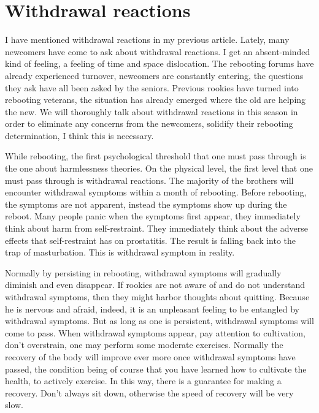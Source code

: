 \documentclass[
]{book}
\begin{document}
\hypertarget{withdrawal-reactions}{%
\section{Withdrawal reactions}\label{withdrawal-reactions}}

I have mentioned withdrawal reactions in my previous article. Lately, many newcomers have come to ask about withdrawal reactions. I get an absent-minded kind of feeling, a feeling of time and space dislocation. The rebooting forums have already experienced turnover, newcomers are constantly entering, the questions they ask have all been asked by the seniors. Previous rookies have turned into rebooting veterans, the situation has already emerged where the old are helping the new. We will thoroughly talk about withdrawal reactions in this season in order to eliminate any concerns from the newcomers, solidify their rebooting determination, I think this is necessary.

While rebooting, the first psychological threshold that one must pass through is the one about harmlessness theories. On the physical level, the first level that one must pass through is withdrawal reactions. The majority of the brothers will encounter withdrawal symptoms within a month of rebooting. Before rebooting, the symptoms are not apparent, instead the symptoms show up during the reboot. Many people panic when the symptoms first appear, they immediately think about harm from self-restraint. They immediately think about the adverse effects that self-restraint has on prostatitis. The result is falling back into the trap of masturbation. This is withdrawal symptom in reality.

Normally by persisting in rebooting, withdrawal symptoms will gradually diminish and even disappear. If rookies are not aware of and do not understand withdrawal symptoms, then they might harbor thoughts about quitting. Because he is nervous and afraid, indeed, it is an unpleasant feeling to be entangled by withdrawal symptoms. But as long as one is persistent, withdrawal symptoms will come to pass. When withdrawal symptoms appear, pay attention to cultivation, don't overstrain, one may perform some moderate exercises. Normally the recovery of the body will improve ever more once withdrawal symptoms have passed, the condition being of course that you have learned how to cultivate the health, to actively exercise. In this way, there is a guarantee for making a recovery. Don't always sit down, otherwise the speed of recovery will be very slow.
\end{document}
